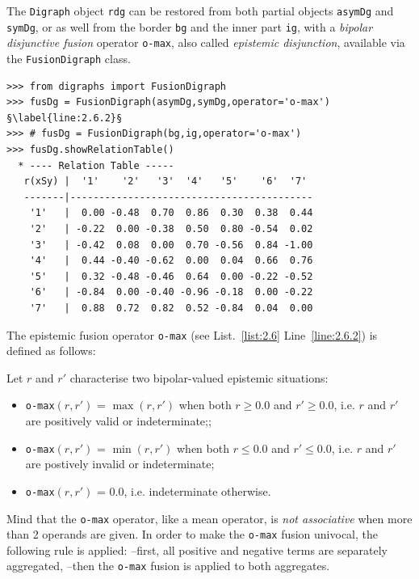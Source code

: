 The \texttt{Digraph} object \texttt{rdg} can be restored from both partial objects \texttt{asymDg} and \texttt{symDg}, or as well from the border \texttt{bg} and the inner part \texttt{ig}, with a \emph{bipolar disjunctive fusion} operator \texttt{o-max}, also called \emph{epistemic disjunction}, available via the \texttt{FusionDigraph} class. 
\begin{lstlisting}[caption={Epistemic fusion of partial diagraphs},label=list:2.6]
>>> from digraphs import FusionDigraph
>>> fusDg = FusionDigraph(asymDg,symDg,operator='o-max') §\label{line:2.6.2}§
>>> # fusDg = FusionDigraph(bg,ig,operator='o-max')
>>> fusDg.showRelationTable()
  * ---- Relation Table -----
   r(xSy) |  '1'    '2'   '3'  '4'   '5'    '6'  '7'	  
   -------|------------------------------------------
    '1'   |  0.00 -0.48  0.70  0.86  0.30  0.38  0.44	 
    '2'   | -0.22  0.00 -0.38  0.50  0.80 -0.54  0.02	 
    '3'   | -0.42  0.08  0.00  0.70 -0.56  0.84 -1.00	 
    '4'   |  0.44 -0.40 -0.62  0.00  0.04  0.66  0.76	 
    '5'   |  0.32 -0.48 -0.46  0.64  0.00 -0.22 -0.52	 
    '6'   | -0.84  0.00 -0.40 -0.96 -0.18  0.00 -0.22	 
    '7'   |  0.88  0.72  0.82  0.52 -0.84  0.04  0.00
\end{lstlisting}

The epistemic fusion operator \texttt{o-max} (see List.~\vref{list:2.6} Line~\ref{line:2.6.2}) is defined as follows:
\begin{definition}\label{def:disjunctiveFusion}

\noindent Let $r$ and $r'$ characterise two bipolar-valued epistemic situations:
\begin{itemize}[leftmargin=0.5cm,rightmargin=0.5cm,nosep]
\item \texttt{o-max}$(r, r')$ = $\max(r, r' )$ when both $r \geqslant 0.0$ and $r' \geqslant 0.0$, i.e. $r$ and $r'$ are positively valid or indeterminate;;
\item \texttt{o-max}$(r, r')$ = $\min(r, r' )$ when both $r \leqslant 0.0$ and $r' \leqslant 0.0$, i.e. $r$ and $r'$ are postively invalid or indeterminate;
\item \texttt{o-max}$(r, r')$ = $0.0$, i.e. indeterminate otherwise.
\end{itemize}
\end{definition}

Mind that the \texttt{o-max} operator, like a mean operator, is \emph{not associative} when more than 2 operands are given. In order to make the \texttt{o-max} fusion univocal, the following rule is applied: --first, all positive and negative terms are separately aggregated, --then the \texttt{o-max} fusion is applied to both aggregates.


